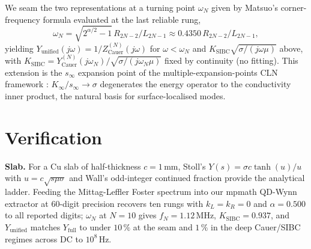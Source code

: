 \documentclass[journal,9pt]{igtesymp}
\begin{document}
We seam the two representations at a turning point $\omega_N$ given by Matsuo's corner-frequency formula \cite{Matsuo_2026} evaluated at the last reliable rung,
\begin{equation}
\omega_N \!=\! \sqrt{2^{\alpha/2}\!-\!1}\,R_{2N\!-\!2}/L_{2N\!-\!1} \!\approx\! 0.4350\,R_{2N\!-\!2}/L_{2N\!-\!1}, \label{eq:omegaN}
\end{equation}
yielding $Y_{\text{unified}}(j\omega)\!=\!1/Z_{\text{Cauer}}^{(N)}(j\omega)$ for $\omega\!<\!\omega_N$ and $K_{\text{SIBC}}\sqrt{\sigma/(j\omega\mu)}$ above, with $K_{\text{SIBC}}\!=\!Y_{\text{Cauer}}^{(N)}(j\omega_N)/\sqrt{\sigma/(j\omega_N\mu)}$ fixed by continuity (no fitting).  This extension is the $s_\infty$ expansion point of the multiple-expansion-points CLN framework \cite{Kuriyama_2019}: $K_\infty/s_\infty\!\to\!\sigma$ degenerates the energy operator to the conductivity inner product, the natural basis for surface-localised modes.

\section{Verification}

{\bf Slab.}  For a Cu slab of half-thickness $c\!=\!1$\,mm, Stoll's $Y(s)\!=\!\sigma c\tanh(u)/u$ with $u\!=\!c\sqrt{s\mu\sigma}$ \cite{Stoll1974} and Wall's odd-integer continued fraction \cite{Wall1948} provide the analytical ladder.  Feeding the Mittag-Leffler Foster spectrum into our mpmath QD-Wynn extractor at 60-digit precision recovers ten rungs with $k_L\!=\!k_R\!=\!0$ \cite{Matsuo_2026} and $\alpha\!=\!0.500$ to all reported digits; $\omega_N$ at $N\!=\!10$ gives $f_N\!=\!1.12$\,MHz, $K_{\text{SIBC}}\!=\!0.937$, and $Y_{\text{unified}}$ matches $Y_{\text{full}}$ to under $10\,\%$ at the seam and $1\,\%$ in the deep Cauer/SIBC regimes across DC to $10^{8}$\,Hz.
\end{document}
